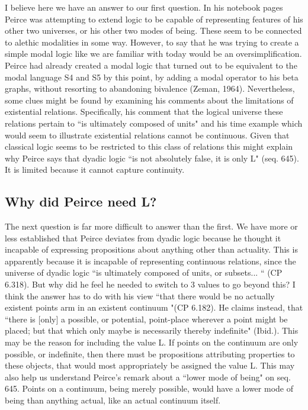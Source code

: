 \documentclass[12pt]{article}
\begin{document}
I believe here we have an answer to our first question. In his notebook pages Peirce was attempting to extend logic to be capable of representing features of his other two universes, or his other two modes of being. These seem to be connected to alethic modalities in some way. However, to say that he was trying to create a simple modal logic like we are familiar with today would be an oversimplification. Peirce had already created a modal logic that turned out to be equivalent to the modal language S4 and S5 by this point, by adding a modal operator to his beta graphs, without resorting to abandoning bivalence (Zeman, 1964). Nevertheless, some clues might be found by examining his comments about the limitations of existential relations. Specifically, his comment that the logical universe these relations pertain to ``is ultimately composed of units" and his time example which would seem to illustrate existential relations cannot be continuous. Given that classical logic seems to be restricted to this class of relations this might explain why Peirce says that dyadic logic ``is not absolutely false, it is only L" (seq. 645). It is limited because it cannot capture continuity.

\subsection{Why did Peirce need L?}

The next question is far more difficult to answer than the first. We have more or less established that Peirce deviates from dyadic logic because he thought it incapable of expressing propositions about anything other than actuality. This is apparently because it is incapable of representing continuous relations, since the universe of dyadic logic ``is ultimately composed of units, or subsets... “ (CP 6.318). But why did he feel he needed to switch to 3 values to go beyond this? I think the answer has to do with his view ``that there would be no actually existent points arm in an existent continuum "(CP 6.182). He claims instead, that ``there is [only] a possible, or potential, point-place wherever a point might be placed; but that which only maybe is necessarily thereby indefinite" (Ibid.). This may be the reason for including the value L. If points on the continuum are only possible, or indefinite, then there must be propositions attributing properties to these objects, that would most appropriately be assigned the value L. This may also help us understand Peirce's remark about a ``lower mode of being" on seq. 645. Points on a continuum, being merely possible, would have a lower mode of being than anything actual, like an actual continuum itself.
\end{document}
